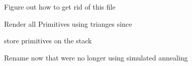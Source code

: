 
\begin{DoxyRefList}
\item[\label{todo__todo000004}%
\Hypertarget{todo__todo000004}%
Namespace \hyperlink{namespacenta}{nta} ]Figure out how to get rid of this file  
\item[\label{todo__todo000002}%
\Hypertarget{todo__todo000002}%
Member \hyperlink{classnta_1_1PrimitiveBatch_a8b1bcf740a16d65a79566c0a9aebd117}{nta\+:\+:Primitive\+Batch\+:\+:create\+Render\+Batches} ()]Render all Primitives using trianges since  
\item[\label{todo__todo000001}%
\Hypertarget{todo__todo000001}%
Member \hyperlink{classnta_1_1PrimitiveBatch_a85b1ab0111c7d02d5899f47fe1946c4f}{nta\+:\+:Primitive\+Batch\+:\+:m\+\_\+primitives} ]store primitives on the stack  
\item[\label{todo__todo000003}%
\Hypertarget{todo__todo000003}%
Member \hyperlink{classnta_1_1SpriteFont_a9dc96f31efd0830dcb476ea87534e358}{nta\+:\+:Sprite\+Font\+:\+:Sprite\+Font} (crstring font\+Path, unsigned int size)]Rename now that we\textquotesingle{}re no longer using simulated annealing 
\end{DoxyRefList}